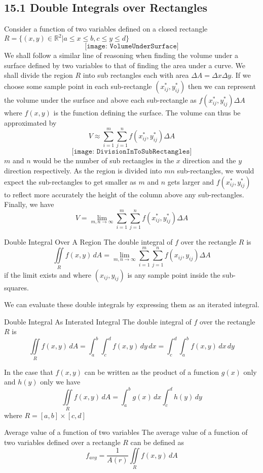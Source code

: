 \documentclass{article}
\begin{document}
	\subsection{15.1 Double Integrals over Rectangles}
	Consider a function of two variables defined on a closed rectangle
	$R = \{(x,y) \in \mathbb{R}^{2} | a \leq x \leq b, c \leq y \leq d\}$
	\[
		\texttt{[image: VolumeUnderSurface]}
	\]
	We shall follow a similar line of reasoning when finding the volume under a
	surface defined by two variables to that of finding the area under a curve. We
	shall divide the region $R$ into sub rectangles each with area $\Delta A = \Delta
	x \Delta y$. If we choose some sample point in each sub-rectangle
	$(x^{*}_{ij},y^{*}_{ij})$ then we can represent the volume under the surface
	and above each sub-rectangle as $f(x^{*}_{ij},y^{*}_{ij})\Delta A$ where
	$f(x,y)$ is the function defining the surface. The volume can thus be approximated
	by
	\[
		V \approx \sum_{i=1}^{m}\sum_{j=1}^{n}f(x^{*}_{ij},y^{*}_{ij}) \Delta A
	\]
	\[
		\texttt{[image: DivisionInToSubRectangles]}
	\]
	$m$ and $n$ would be the number of sub rectangles in the $x$ direction and the
	$y$ direction respectively. As the region is divided into $mn$ sub-rectangles,
	we would expect the sub-rectangles to get smaller as $m$ and $n$ gets larger and
	$f(x^{*}_{ij},y^{*}_{ij})$ to reflect more accurately the height of the column
	above any sub-rectangles. Finally, we have
	\[
		V = \lim_{m,n \to \infty}\sum_{i=1}^{m}\sum_{j=1}^{n}f(x^{*}_{ij},y^{*}_{ij})
		\Delta A
	\]
	\begin{mybox}
		{Double Integral Over A Region} The double integral of $f$ over the rectangle
		$R$ is
		\[
			\iint\limits_{R} f(x,y) \,dA = \lim_{m,n \to \infty}\sum_{i=1}^{m}\sum_{j=1}
			^{n}f(x_{ij},y_{ij}) \Delta A
		\]
		if the limit exists and where $(x_{ij},y_{ij})$ is any sample point inside the
		sub-squares.
	\end{mybox}
	We can evaluate these double integrals by expressing them as an iterated integral.
	\begin{mybox}
		{Double Integral As Interated Integral} The double integral of $f$ over the rectangle
		$R$ is
		\[
			\iint\limits_{R} f(x,y) \,dA = \int_{a}^{b}\int_{c}^{d}f(x,y) \, dy \, dx =
			\int_{c}^{d}\int_{a}^{b}f(x,y) \, dx \, dy
		\]
	\end{mybox}
	In the case that $f(x,y)$ can be written as the product of a function $g(x)$
	only and $h(y)$ only we have
	\[
		\iint\limits_{R} f(x,y) \,dA = \int_{a}^{b}g(x) \, dx \int_{c}^{d}h(y) \, dy
	\]
	where $R = [a,b] \times [c, d]$
	\begin{mybox}
		{Average value of a function of two variables} The average value of a function
		of two variables defined over a rectangle $R$ can be defined as
		\[
			f_{avg}= \frac{1}{A(r)}\iint\limits_{R} f(x,y) \,dA
		\]
	\end{mybox}
\end{document}
